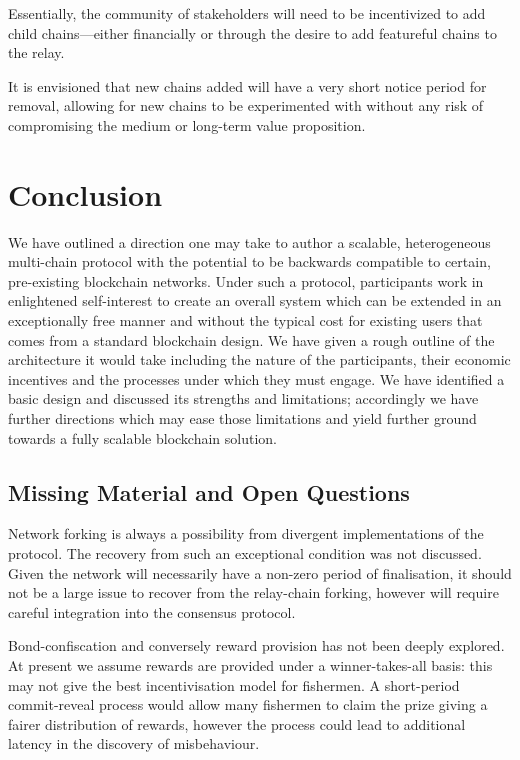 \documentclass[9pt,oneside]{amsart}
\begin{document}
\begin{multicols}{2}
 Essentially, the community of stakeholders will need to be incentivized to add child chains---either financially or through the desire to add featureful chains to the relay.

 It is envisioned that new chains added will have a very short notice period for removal, allowing for new chains to be experimented with without any risk of compromising the medium or long-term value proposition.

\section{Conclusion} \label{ch:conclusion}

 We have outlined a direction one may take to author a scalable, heterogeneous multi-chain protocol with the potential to be backwards compatible to certain, pre-existing blockchain networks. Under such a protocol, participants work in enlightened self-interest to create an overall system which can be extended in an exceptionally free manner and without the typical cost for existing users that comes from a standard blockchain design. We have given a rough outline of the architecture it would take including the nature of the participants, their economic incentives and the processes under which they must engage. We have identified a basic design and discussed its strengths and limitations; accordingly we have further directions which may ease those limitations and yield further ground towards a fully scalable blockchain solution.

\subsection{Missing Material and Open Questions}
\label{open-questions-and-further-work}

 Network forking is always a possibility from divergent implementations of the protocol. The recovery from such an exceptional condition was not discussed. Given the network will necessarily have a non-zero period of finalisation, it should not be a large issue to recover from the relay-chain forking, however will require careful integration into the consensus protocol.


 Bond-confiscation and conversely reward provision has not been deeply explored. At present we assume rewards are provided under a winner-takes-all basis: this may not give the best incentivisation model for fishermen. A short-period commit-reveal process would allow many fishermen to claim the prize giving a fairer distribution of rewards, however the process could lead to additional latency in the discovery of misbehaviour.


\end{multicols}
\end{document}

